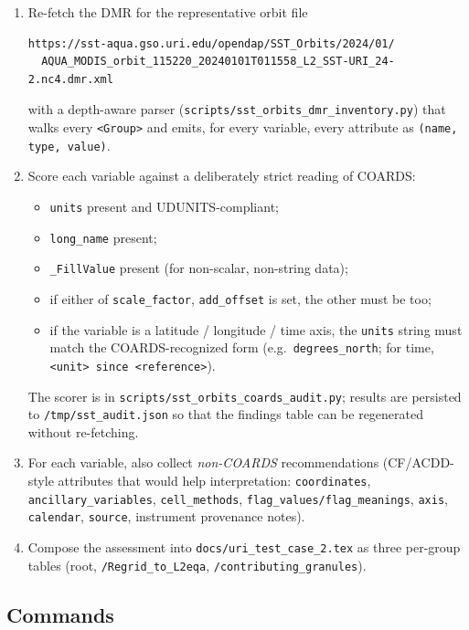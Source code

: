 \documentclass[11pt]{article}
\begin{document}
\begin{enumerate}
  \item Re-fetch the DMR for the representative orbit file
    \begin{lstlisting}
https://sst-aqua.gso.uri.edu/opendap/SST_Orbits/2024/01/
  AQUA_MODIS_orbit_115220_20240101T011558_L2_SST-URI_24-2.nc4.dmr.xml
    \end{lstlisting}
    with a depth-aware parser
    (\texttt{scripts/sst\_orbits\_dmr\_inventory.py}) that walks
    every \texttt{<Group>} and emits, for every variable, every
    attribute as \texttt{(name, type, value)}.
  \item Score each variable against a deliberately strict reading
    of COARDS:
    \begin{itemize}
      \item \texttt{units} present and UDUNITS-compliant;
      \item \texttt{long\_name} present;
      \item \texttt{\_FillValue} present (for non-scalar,
        non-string data);
      \item if either of \texttt{scale\_factor},
        \texttt{add\_offset} is set, the other must be too;
      \item if the variable is a latitude / longitude / time
        axis, the \texttt{units} string must match the
        COARDS-recognized form (e.g.\
        \texttt{degrees\_north}; for time, \texttt{<unit> since
        <reference>}).
    \end{itemize}
    The scorer is in
    \texttt{scripts/sst\_orbits\_coards\_audit.py}; results are
    persisted to \texttt{/tmp/sst\_audit.json} so that the
    findings table can be regenerated without re-fetching.
  \item For each variable, also collect \emph{non-COARDS}
    recommendations (CF/ACDD-style attributes that would help
    interpretation: \texttt{coordinates},
    \texttt{ancillary\_variables}, \texttt{cell\_methods},
    \texttt{flag\_values/flag\_meanings}, \texttt{axis},
    \texttt{calendar}, \texttt{source}, instrument provenance
    notes).
  \item Compose the assessment into
    \texttt{docs/uri\_test\_case\_2.tex} as three per-group
    tables (root, \texttt{/Regrid\_to\_L2eqa},
    \texttt{/contributing\_granules}).
\end{enumerate}

\subsection{Commands}
\end{document}

